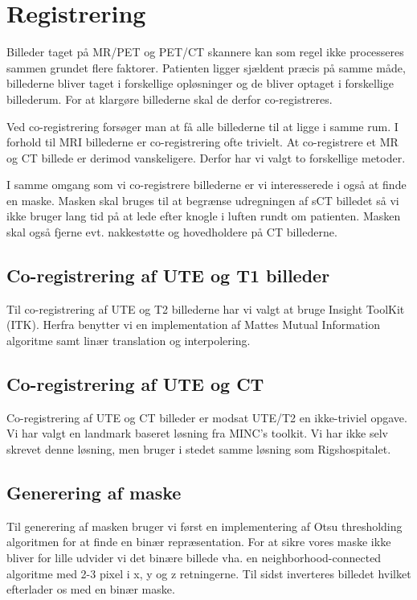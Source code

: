 \section{Registrering}

Billeder taget på MR/PET og PET/CT skannere kan som regel ikke
processeres sammen grundet flere faktorer. Patienten ligger sjældent
præcis på samme måde, billederne bliver taget i forskellige
opløsninger og de bliver optaget i forskellige billederum. For at
klargøre billederne skal de derfor co-registreres.

Ved co-registrering forsøger man at få alle billederne til at ligge i
samme rum. I forhold til MRI billederne er co-registrering ofte trivielt.
At co-registrere et MR og CT billede er derimod vanskeligere. Derfor har
vi valgt to forskellige metoder.

I samme omgang som vi co-registrere billederne er vi interesserede i
også at finde en maske. Masken skal bruges til at begrænse udregningen
af sCT billedet så vi ikke bruger lang tid på at lede efter knogle i
luften rundt om patienten. Masken skal også fjerne evt. nakkestøtte og
hovedholdere på CT billederne.

\subsection{Co-registrering af UTE og T1 billeder}

Til co-registrering af UTE og T2 billederne har vi valgt at bruge
Insight ToolKit (ITK). Herfra benytter vi en implementation af Mattes
Mutual Information algoritme samt linær translation og interpolering.

\subsection{Co-registrering af UTE og CT}

Co-registrering af UTE og CT billeder er modsat UTE/T2 en ikke-triviel
opgave. Vi har valgt en landmark baseret løsning fra MINC's toolkit.
Vi har ikke selv skrevet denne løsning, men bruger i stedet samme
løsning som Rigshospitalet.

\subsection{Generering af maske}

Til generering af masken bruger vi først en implementering af Otsu
thresholding algoritmen for at finde en binær repræsentation. For at
sikre vores maske ikke bliver for lille udvider vi det binære billede
vha. en neighborhood-connected algoritme med 2-3 pixel i x, y og z
retningerne. Til sidst inverteres billedet hvilket efterlader os med en
binær maske.
